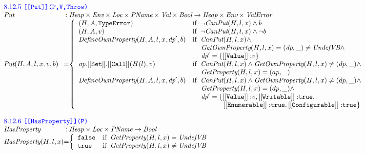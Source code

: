 \documentclass[a4paper, leqno]{amsart}
\def\inblue{\color{blue}}
\newcommand{\UndefVB}{\emph{UndefVB}}
\newcommand{\false}{{\tt false}}
\newcommand{\true}{{\tt true}}
\newcommand{\Bool}{\emph{Bool}}
\newcommand{\ValError}{\emph{ValError}}
\newcommand{\te}{{\tt TypeError}}
\newcommand{\Val}{\emph{Val}}
\newcommand{\Loc}{\emph{Loc}}
\newcommand{\Heap}{\emph{Heap}}
\newcommand{\Prop}{\emph{PName}}
\newcommand{\Env}{\emph{Env}}
\newcommand{\hf}[1]{\emph{#1}}
\newcommand{\ifc}[1]{{\rm if}\begin{array}[t]{l}#1\end{array}}
\def\inblue{\color{blue}}
\begin{document}
\[
\begin{array}{l@{}c@{}l}

\multicolumn{3}{l}{\mbox{\inblue 8.12.5 {\tt [[Put]](P,V,Throw)}}}\\
\hf{Put} & :& \Heap \times \Env \times \Loc \times \Prop \times \Val \times \Bool
\rightarrow \Heap \times \Env \times \ValError \\
\hf{Put}(H,A,l,x,v,b) &=&
\left\{\begin{array}{ll}
(H, A, \te) & \ifc{\neg\hf{CanPut}(H,l,x)\wedge b} \\
(H, A, v) & \ifc{\neg\hf{CanPut}(H,l,x)\wedge \neg b} \\
\hf{DefineOwnProperty}(H,A,l,x,\emph{dp}',b)
&\ifc{\hf{CanPut}(H,l,x)\wedge}\\
&\mbox{\phantom{if \ }$\hf{GetOwnProperty}(H,l,x) = (\emph{dp}, \_)\not=\UndefVB\wedge$}\\
&\mbox{\phantom{if \ }$\emph{dp}' = \{{\tt[[Value]]:}v\}$}\\
\emph{ap}.{\tt[[Set]]}.{\tt[[Call]]}(H(l), v)
&\ifc{\hf{CanPut}(H,l,x)\wedge\hf{GetOwnProperty}(H,l,x) \not= (dp, \_)\wedge}\\
&\mbox{\phantom{if \ }$\hf{GetProperty}(H,l,x) = (ap, \_)$}\\
\hf{DefineOwnProperty}(H,A,l,x,\emph{dp}',b)
&\ifc{\hf{CanPut}(H,l,x)\wedge\hf{GetOwnProperty}(H,l,x) \not= (dp, \_)\wedge}\\
&\mbox{\phantom{if \ }$\hf{GetProperty}(H,l,x) = (dp, \_)\wedge$}\\
&\mbox{\phantom{if \ }$\emph{dp}' = \{{\tt[[Value]]:}v, {\tt[[Writable]]:}\true,$}\\
&\mbox{\phantom{if \ \emph{dp}' = \{}${\tt[[Enumerable]]:}\true,
 {\tt[[Configurable]]:}\true\}$}
\end{array}\right.
\\\\

\multicolumn{3}{l}{\mbox{\inblue 8.12.6 {\tt [[HasProperty]](P)}}}\\
\hf{HasProperty} & :& \Heap \times \Loc \times \Prop \rightarrow \Bool \\
\hf{HasProperty}(H,l,x) &=&
\left\{\begin{array}{ll}
\false & \ifc{\hf{GetProperty}(H,l,x) = \UndefVB} \\
\true & \ifc{\hf{GetProperty}(H,l,x) \not= \UndefVB} \\
\end{array}\right.
\\[1em]


\end{array}\]
\end{document}
